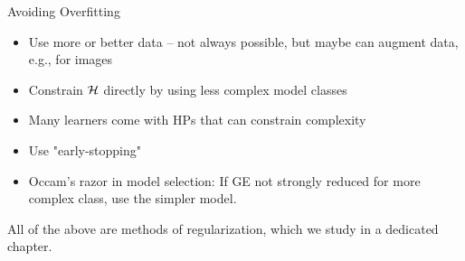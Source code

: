 \begin{vbframe}{Avoiding Overfitting}

\begin{itemize}
  \item Use more or better data -- not always possible, but maybe can augment data, 
      e.g., for images
  \item Constrain $\mathcal{H}$ directly by using less complex model classes
  \item Many learners come with HPs that can 
      constrain complexity
  \item Use "early-stopping"
\item Occam's razor in model selection: 
    If GE not strongly reduced for more complex class,
    use the simpler model.
\end{itemize}

\lz

All of the above are methods of regularization,
which we study in a dedicated chapter.

\end{vbframe}

\endlecture

